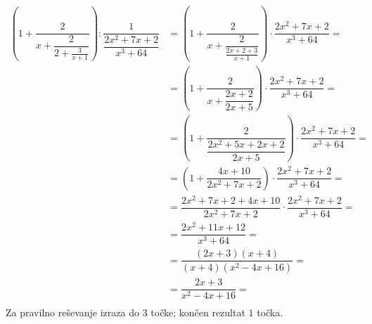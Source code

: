 \documentclass[addpoints]{exam}
\begin{document}
\begin{questions}
    \begin{solution}[7cm]
        \begin{align*}
            \left(1+\dfrac{2}{x+\dfrac{2}{2+\frac{3}{x+1}}}\right):\dfrac{1}{\dfrac{2x^2+7x+2}{x^3+64}} &= \left(1+\dfrac{2}{x+\dfrac{2}{\frac{2x+2+3}{x+1}}}\right)\cdot \dfrac{2x^2+7x+2}{x^3+64}= \\
                                                                                                        &= \left(1+\dfrac{2}{x+\dfrac{2x+2}{2x+5}}\right)\cdot \dfrac{2x^2+7x+2}{x^3+64}= \\
                                                                                                        &= \left(1+\dfrac{2}{\dfrac{2x^2+5x+2x+2}{2x+5}}\right)\cdot \dfrac{2x^2+7x+2}{x^3+64}= \\
                                                                                                        &= \left(1+\dfrac{4x+10}{2x^2+7x+2}\right)\cdot \dfrac{2x^2+7x+2}{x^3+64}= \\
                                                                                                        &= \dfrac{2x^2+7x+2+4x+10}{2x^2+7x+2}\cdot \dfrac{2x^2+7x+2}{x^3+64}= \\
                                                                                                        &= \dfrac{2x^2+11x+12}{x^3+64}= \\
                                                                                                        &= \dfrac{(2x+3)(x+4)}{(x+4)(x^2-4x+16)}= \\
                                                                                                        &= \dfrac{2x+3}{x^2-4x+16}= \\
        \end{align*}
        Za pravilno reševanje izraza do $3$ točke; končen rezultat $1$ točka.
    \end{solution}




\end{questions}
\end{document}
